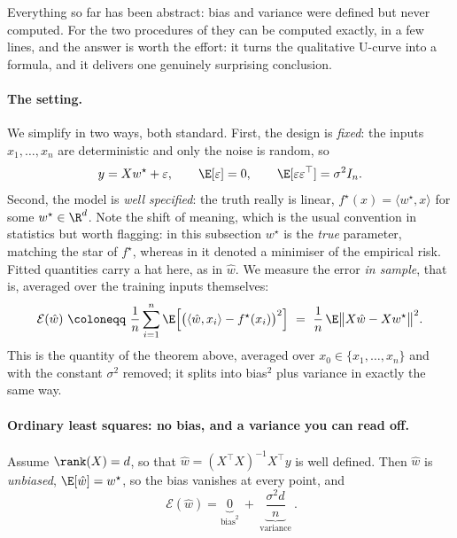 Everything so far has been abstract: bias and variance were defined but never
computed. For the two procedures of  they can be computed exactly,
in a few lines, and the answer is worth the effort: it turns the qualitative U-curve
into a formula, and it delivers one genuinely surprising conclusion.

\paragraph{The setting.}
We simplify in two ways, both standard. First, the design is \emph{fixed}: the inputs
$x_1, \dots, x_n$ are deterministic and only the noise is random, so
\[
y = X w^\star + \varepsilon , \qquad \E[\varepsilon] = 0, \qquad
\E[\varepsilon \varepsilon^\top] = \sigma^2 I_n .
\]
Second, the model is \emph{well specified}: the truth really is linear,
$f^\star(x) = \langle w^\star, x \rangle$ for some $w^\star \in \R^d$. Note the shift
of meaning, which is the usual convention in statistics but worth flagging: in this
subsection $w^\star$ is the \emph{true} parameter, matching the star of $f^\star$,
whereas in  it denoted a minimiser of the empirical risk. Fitted
quantities carry a hat here, as in $\hat w$. We measure the
error \emph{in sample}, that is, averaged over the training inputs themselves:
\[
\mathcal{E}(\hat w) \ \coloneqq \ \frac{1}{n} \sum_{i=1}^n
\E\Big[ \big( \langle \hat w, x_i \rangle - f^\star(x_i) \big)^2 \Big]
\ = \ \frac{1}{n}\, \E \big\Vert X \hat w - X w^\star \big\Vert^2 .
\]
This is the quantity of the theorem above, averaged over $x_0 \in \{x_1, \dots, x_n\}$
and with the constant $\sigma^2$ removed; it splits into bias$^2$ plus variance in
exactly the same way.

\paragraph{Ordinary least squares: no bias, and a variance you can read off.}

\begin{prop}
\label{prop:bv-ols}
Assume $\rank(X) = d$, so that $\hat w = (X^\top X)^{-1} X^\top y$ is well defined.
Then $\hat w$ is \emph{unbiased}, $\E[\hat w] = w^\star$, so the bias vanishes at every
point, and
\[
\boxed{\ \mathcal{E}(\hat w) = \underbrace{0}_{\mathrm{bias}^2} \ + \
\underbrace{\frac{\sigma^2 d}{n}}_{\mathrm{variance}} \ } .
\]
\end{prop}

